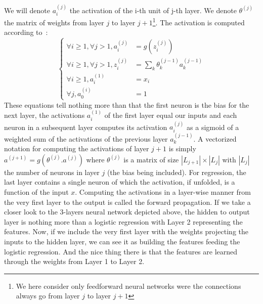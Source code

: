 \documentclass[10pt,a4paper]{article}
\begin{document}
We will denote $a_i^{(j)}$ the activation of the i-th unit of j-th
layer. We denote $\theta^{(j)}$ the matrix of weights from layer $j$
to layer $j+1$\footnote{We here consider only feedforward neural
  networks were the connections always go from layer $j$ to layer
  $j+1$}. The activation is computed according to~:
\begin{equation}
\begin{cases}
\forall i \geq 1, \forall j>1, a_i^{(j)} &= g(z_i^{(j)})\\
\forall i \geq 1, \forall j>1, z_i^{(j)} &= \sum_k \theta_k^{(j-1)} a_k^{(j-1)}\\
\forall i \geq 1, a_i^{(1)} &= x_i\\
\forall j, a_0^{(i)} &= 1
\end{cases}
\end{equation}
These equations tell nothing more than that the first neuron is the
bias for the next layer, the activations $a_i^{(1)}$ of the first layer equal our
inputs and each neuron in a subsequent layer computes its activation $a_i^{(j)}$
as a sigmoid of a weighted sum of the activations of the previous
layer $a_k^{(j-1)}$. A vectorized notation for computing the activations of layer
$j+1$ is simply $a^{(j+1)} = g(\theta^{(j)} . a^{(j)})$ where
$\theta^{(j)}$ is a matrix of size $|L_{j+1}| \times |L_{j}|$ with
$|L_j|$ the number of neurons in layer $j$ (the bias being
included). For regression, the last layer contains a single neuron of
which the activation, if unfolded, is a function of the input
$x$. Computing the activations in a layer-wise manner from the very
first layer to the output is called the forward propagation. If we
take a closer look to the 3-layers neural network depicted above, the
hidden to output layer is nothing more than a logistic regression with
Layer 2 representing the features. Now, if we include the very first
layer with the weights projecting the inputs to the hidden layer, we
can see it as building the features feeding the logistic
regression. And the nice thing there is that the features are learned
through the weights from Layer 1 to Layer 2.
\end{document}
